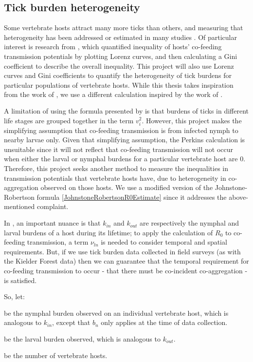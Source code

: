 \documentclass[hidelinks]{article}
\begin{document}
\subsection{Tick burden heterogeneity} 

Some vertebrate hosts attract many more ticks than others, and measuring that heterogeneity has been addressed or estimated in many studies \citep{Woolhouse1997,  Perkins_2003, Brunner2008, DEVEVEY_2012}. Of particular interest is research from \citet{Perkins_2003}, which quantified inequality of hosts' co-feeding transmission potentials by plotting Lorenz curves, and then calculating a Gini coefficient to describe the overall inequality. This project will also use Lorenz curves and Gini coefficients to quantify the heterogeneity of tick burdens for particular populations of vertebrate hosts. While this thesis takes inspiration from the work of \citet{Perkins_2003}, we use a different calculation inspired by the work of \citet{JohnstoneRobertson2020}.

A limitation of using the formula presented by \citet{Perkins_2003} is that burdens of ticks in different life stages are grouped together in the term $ v_i^2 $. However, this project makes the simplifying assumption that co-feeding transmission is from infected nymph to nearby larvae only. Given that simplifying assumption, the Perkins calculation is unsuitable since it will not reflect that co-feeding transmission will not occur when either the larval or nymphal burdens for a particular vertebrate host are $ 0 $. Therefore, this project seeks another method to measure the inequalities in transmission potentials that vertebrate hosts have, due to heterogeneity in co-aggregation observed on those hosts. We use a modified version of the Johnstone-Robertson formula \eqref{JohnstoneRobertsonR0Estimate} since it addresses the above-mentioned complaint.

In \citet{JohnstoneRobertson2020}, an important nuance is that $ k_{in} $ and $ k_{out} $ are respectively the nymphal and larval burdens of a host during its lifetime; to apply the calculation of $ R_0 $ to co-feeding transmission, a term $ \nu_{ln} $ is needed to consider temporal and spatial requirements. But, if we use tick burden data collected in field surveys (as with the Kielder Forest data) then we can guarantee that the temporal requirement for co-feeding transmission to occur - that there must be co-incident co-aggregation - is satisfied.

So, let:

\begin{description}[leftmargin=1.5cm, style=multiline]
	\item[$ b_n $] be the nymphal burden observed on an individual vertebrate host, which is analogous to $ k_{in} $, except that $ b_n $ only applies at the time of data collection.
	\item[$ b_l $] be the larval burden observed, which is analogous to $ k_{out} $.
	\item[$ m $] be the number of vertebrate hosts.
\end{description}
\end{document}
